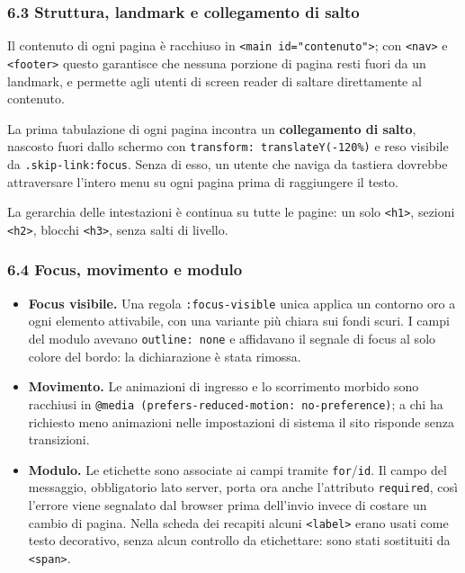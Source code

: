 \documentclass[
  11pt,
]{article}
\providecommand{\tightlist}{%
  \setlength{\itemsep}{0pt}\setlength{\parskip}{0pt}}
\begin{document}
\hypertarget{struttura-landmark-e-collegamento-di-salto}{%
\subsubsection{6.3 Struttura, landmark e collegamento di
salto}\label{struttura-landmark-e-collegamento-di-salto}}

Il contenuto di ogni pagina è racchiuso in
\texttt{\textless{}main\ id="contenuto"\textgreater{}}; con
\texttt{\textless{}nav\textgreater{}} e
\texttt{\textless{}footer\textgreater{}} questo garantisce che nessuna
porzione di pagina resti fuori da un landmark, e permette agli utenti di
screen reader di saltare direttamente al contenuto.

La prima tabulazione di ogni pagina incontra un \textbf{collegamento di
salto}, nascosto fuori dallo schermo con
\texttt{transform:\ translateY(-120\%)} e reso visibile da
\texttt{.skip-link:focus}. Senza di esso, un utente che naviga da
tastiera dovrebbe attraversare l'intero menu su ogni pagina prima di
raggiungere il testo.

La gerarchia delle intestazioni è continua su tutte le pagine: un solo
\texttt{\textless{}h1\textgreater{}}, sezioni
\texttt{\textless{}h2\textgreater{}}, blocchi
\texttt{\textless{}h3\textgreater{}}, senza salti di livello.

\hypertarget{focus-movimento-e-modulo}{%
\subsubsection{6.4 Focus, movimento e
modulo}\label{focus-movimento-e-modulo}}

\begin{itemize}
\tightlist
\item
  \textbf{Focus visibile.} Una regola \texttt{:focus-visible} unica
  applica un contorno oro a ogni elemento attivabile, con una variante
  più chiara sui fondi scuri. I campi del modulo avevano
  \texttt{outline:\ none} e affidavano il segnale di focus al solo
  colore del bordo: la dichiarazione è stata rimossa.
\item
  \textbf{Movimento.} Le animazioni di ingresso e lo scorrimento morbido
  sono racchiusi in
  \texttt{@media\ (prefers-reduced-motion:\ no-preference)}; a chi ha
  richiesto meno animazioni nelle impostazioni di sistema il sito
  risponde senza transizioni.
\item
  \textbf{Modulo.} Le etichette sono associate ai campi tramite
  \texttt{for}/\texttt{id}. Il campo del messaggio, obbligatorio lato
  server, porta ora anche l'attributo \texttt{required}, così l'errore
  viene segnalato dal browser prima dell'invio invece di costare un
  cambio di pagina. Nella scheda dei recapiti alcuni
  \texttt{\textless{}label\textgreater{}} erano usati come testo
  decorativo, senza alcun controllo da etichettare: sono stati
  sostituiti da \texttt{\textless{}span\textgreater{}}.
\end{itemize}
\end{document}
